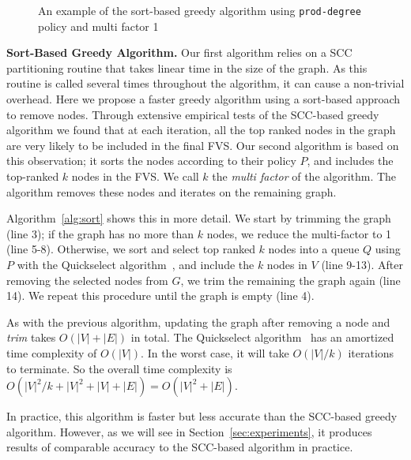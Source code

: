 \begin{figure}[t]
\begin{minipage}[b]{0.19\linewidth}
   		\end{minipage}
  	\vspace{-1em}             
   \caption{An example of the sort-based greedy algorithm using \texttt{prod-degree} policy and multi factor 1}
   \label{fig:simple}               
   \vspace{-1em}    	
\end{figure}

{\bf Sort-Based Greedy Algorithm.} Our first algorithm relies on a SCC partitioning routine that takes linear time in the size of the graph. As this routine is called several times throughout the algorithm, it can cause a non-trivial overhead. Here we propose a faster greedy algorithm using a sort-based approach to remove nodes. Through extensive empirical tests of the SCC-based greedy algorithm we found that at each iteration, all the top ranked nodes in the graph are very likely to be included in the final FVS. Our second algorithm is based on this observation; it sorts the nodes according to their policy $P$, and includes the top-ranked $k$ nodes in the FVS. We call $k$ the \emph{multi factor} of the algorithm. The algorithm removes these nodes and iterates on the remaining graph.

Algorithm~\ref{alg:sort} shows this in more detail. We start by trimming the graph (line 3); if the graph has no more than $k$ nodes, we reduce the multi-factor to 1 (line 5-8). Otherwise, we sort and select top ranked $k$ nodes into a queue $Q$ using $P$ with the Quickselect algorithm~\cite{hoare61cacm}, and include the $k$ nodes in $V$ (line 9-13).
After removing the selected nodes from $G$, we trim the remaining the graph
again (line 14). We repeat this procedure until the graph is empty (line 4). 

As with the previous algorithm, updating the graph after removing a node and \emph{trim} takes $O(|V|+|E|)$ in total. The
Quickselect algorithm~\cite{hoare61cacm} has an amortized time complexity of
$O(|V|)$. In the worst case, it will take $O(|V|/k)$ iterations to terminate. So
the overall time complexity is $O(|V|^2/k + |V|^2 + |V| + |E|)=O(|V|^2+|E|)$.

In practice, this algorithm is faster but less accurate than the SCC-based greedy algorithm. However, as we will see in Section~\ref{sec:experiments}, it produces results of comparable accuracy to the SCC-based algorithm in practice.

